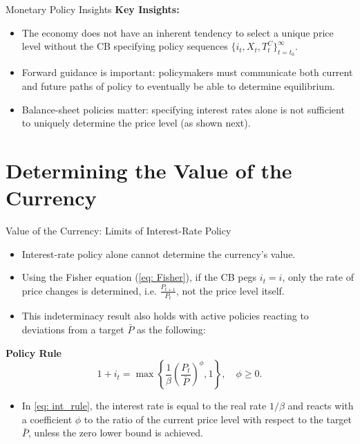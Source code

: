 \documentclass[11pt,aspectratio=169]{beamer}
\begin{document}
\begin{frame}{Monetary Policy Insights}
\textbf{Key Insights:}
\begin{itemize}
    \item The economy does not have an inherent tendency to select a unique price level without the CB specifying policy sequences $\{i_t, X_t, T_t^C\}_{t=t_0}^\infty$.
    \vspace{0.3cm}
    \item Forward guidance is important: policymakers must communicate both current and future paths of policy to eventually be able to determine equilibrium.
    \vspace{0.3cm}
    \item Balance-sheet policies matter: specifying interest rates alone is not sufficient to uniquely determine the price level (as shown next).
\end{itemize}
\end{frame}

\section{Determining the Value of the Currency}

\begin{frame}{Value of the Currency: Limits of Interest-Rate Policy}
\begin{itemize}
    \item Interest-rate policy alone cannot determine the currency's value.
    \item Using the Fisher equation (\ref{eq: Fisher}), if the CB pegs $i_t = i$, only the rate of price changes is determined, i.e. $\frac{P_{t+1}}{P_{t}}$, not the price level itself.
    \item This indeterminacy result also holds with active policies reacting to deviations from a target $\bar{P}$ as the following:
\end{itemize}
\textbf{Policy Rule}
    \begin{equation} \label{eq: int_rule}
        1 + i_t = \max \left\{ \frac{1}{\beta} \left( \frac{P_t}{\bar{P}} \right)^\phi, 1 \right\}, \quad \phi \ge 0.
    \end{equation}
\begin{itemize}
    \item In \eqref{eq: int_rule}, the interest rate is equal to the real rate $1/\beta$ and reacts with a coefficient $\phi$ to the ratio of the current price level with respect to the target $\bar{P}$, unless the zero lower bound is achieved.
\end{itemize}
\end{frame}
\end{document}
